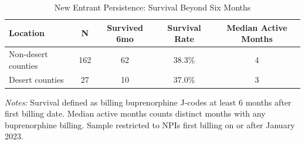 \begin{table}[htbp]
\centering
\caption{New Entrant Persistence: Survival Beyond Six Months}
\label{tab:survival}
\begin{threeparttable}
\begin{tabular}{lcccc}
\hline\hline
Location & N & Survived 6mo & Survival Rate & Median Active Months \\
\hline
Non-desert counties & 162 & 62 & 38.3\% & 4 \\
Desert counties & 27 & 10 & 37.0\% & 3 \\
\hline\hline
\end{tabular}
\begin{tablenotes}[flushleft]\small
\item \textit{Notes:} Survival defined as billing buprenorphine J-codes at least 6 months after first billing date. Median active months counts distinct months with any buprenorphine billing. Sample restricted to NPIs first billing on or after January 2023.
\end{tablenotes}
\end{threeparttable}
\end{table}
